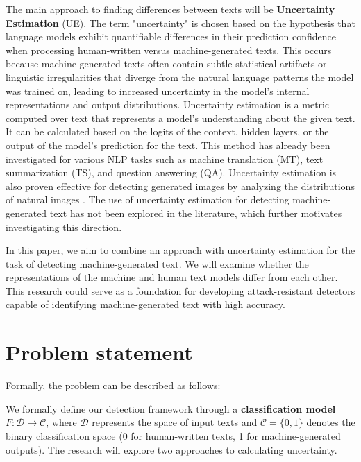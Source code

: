 \documentclass[a4paper, 12pt]{article}
\begin{document}
The main approach to finding differences between texts will be \textbf{Uncertainty Estimation} (UE). The term "uncertainty" is chosen based on the hypothesis that language models exhibit quantifiable differences in their prediction confidence when processing human-written versus machine-generated texts. This occurs because machine-generated texts often contain subtle statistical artifacts or linguistic irregularities that diverge from the natural language patterns the model was trained on, leading to increased uncertainty in the model's internal representations and output distributions. Uncertainty estimation is a metric computed over text that represents a model’s understanding about the given text. It can be calculated based on the logits of the context, hidden layers, or the output of the model’s prediction for the text. This method has already been investigated for various NLP tasks such as machine translation (MT), text summarization (TS), and question answering (QA)\citep{Polygraph}. Uncertainty estimation is also proven effective for detecting generated images by analyzing the distributions of natural images \citep{Image_uncertainty}. The use of uncertainty estimation for detecting machine-generated text has not been explored in the literature, which further motivates investigating this direction.

In this paper, we aim to combine an approach with uncertainty estimation for the task of detecting machine-generated text. We will examine whether the representations of the machine and human text models differ from each other. This research could serve as a foundation for developing attack-resistant detectors capable of identifying machine-generated text with high accuracy.

\section{Problem statement}

Formally, the problem can be described as follows:  

We formally define our detection framework through a \textbf{classification model} \( F: \mathcal{D} \rightarrow \mathcal{C} \), where \(\mathcal{D}\) represents the space of input texts and \(\mathcal{C} = \{0,1\}\) denotes the binary classification space (0 for human-written texts, 1 for machine-generated outputs). The research will explore two approaches to calculating uncertainty.
\end{document}
